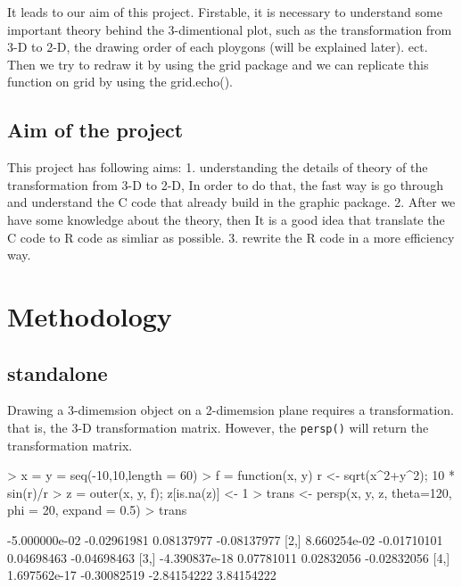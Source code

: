 \documentclass[a4paper,10pt]{article}
\begin{document}
It leads to our aim of this project. Firstable, it is necessary to understand some important theory behind the 3-dimentional plot, such as the transformation from 3-D to 2-D, the drawing order of each ploygons (will be explained later). ect. 
Then we try to redraw it by using the grid package and we can replicate this function on grid by using the grid.echo().


\subsection{Aim of the project}
This project has following aims:
1. understanding the details of theory of the transformation from 3-D to 2-D, In order to do that, the fast way is go through and understand the C code that already build in the graphic package.
2. After we have some knowledge about the theory, then It is a good idea that translate the C code to R code as simliar as possible.
3. rewrite the R code in a more efficiency way.

\section{Methodology}
\subsection{standalone}
Drawing a 3-dimemsion object on a 2-dimemsion plane requires a transformation. that is, the 3-D transformation matrix. However, the \texttt{persp()} will return the transformation matrix.

\begin{Schunk}
\begin{Sinput}
> x = y = seq(-10,10,length = 60)
> f = function(x, y) { r <- sqrt(x^2+y^2); 10 * sin(r)/r }
> z = outer(x, y, f); z[is.na(z)] <- 1
> trans <- persp(x, y, z, theta=120, phi = 20, expand = 0.5)
> trans
\end{Sinput}
\end{Schunk}

\begin{Schunk}
\begin{Soutput}
              [,1]        [,2]        [,3]        [,4]
[1,] -5.000000e-02 -0.02961981  0.08137977 -0.08137977
[2,]  8.660254e-02 -0.01710101  0.04698463 -0.04698463
[3,] -4.390837e-18  0.07781011  0.02832056 -0.02832056
[4,]  1.697562e-17 -0.30082519 -2.84154222  3.84154222
\end{Soutput}
\end{Schunk}
\end{document}
